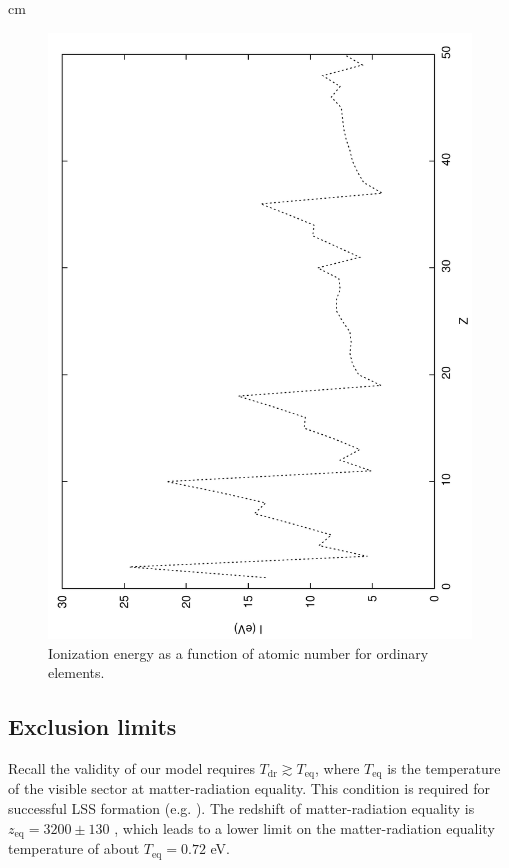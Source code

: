 \documentclass[12pt]{article}
\begin{document}
 cm

%
\begin{figure}[htpb]
    \centering
        \includegraphics[scale=0.5, angle=270]{fig6}
    \caption{Ionization energy as a function of atomic number for ordinary elements.}
    \label{fig:Ionization}
\end{figure}
%
\newpage

\subsection{Exclusion limits}

Recall the validity of our model requires $T _{\text{dr}} \gtrsim T _{\text{eq}}$, where $T _{\text{eq}}$ is the temperature of the visible sector at matter-radiation equality. This condition is required for successful LSS formation (e.g. \cite{volkaspetraki}). The redshift of matter-radiation equality is $z _{\text{eq}} = 3200 \pm 130$ \cite{pdg}, which leads to a lower limit on the matter-radiation equality temperature of about $T _{\text{eq}} = 0.72$ eV.
\end{document}

